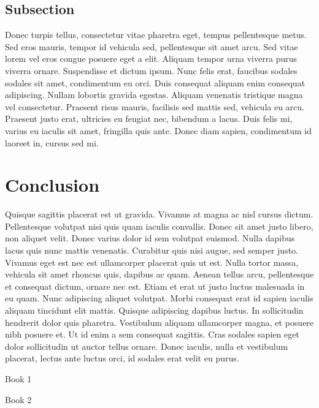 \documentclass[11pt,a4paper]{article}
\begin{document}
\subsection{Subsection}

Donec turpis tellus, consectetur vitae pharetra eget, tempus pellentesque metus. Sed eros mauris, tempor id vehicula sed, pellentesque sit amet arcu. Sed vitae lorem vel eros congue posuere eget a elit. Aliquam tempor urna viverra purus viverra ornare. Suspendisse et dictum ipsum. Nunc felis erat, faucibus sodales sodales sit amet, condimentum eu orci. Duis consequat aliquam enim consequat adipiscing. Nullam lobortis gravida egestas. Aliquam venenatis tristique magna vel consectetur. Praesent risus mauris, facilisis sed mattis sed, vehicula eu arcu. Praesent justo erat, ultricies eu feugiat nec, bibendum a lacus. Duis felis mi, varius eu iaculis sit amet, fringilla quis ante. Donec diam sapien, condimentum id laoreet in, cursus sed mi.

\section{Conclusion}

Quisque sagittis placerat est ut gravida. Vivamus at magna ac nisl cursus dictum. Pellentesque volutpat nisi quis quam iaculis convallis. Donec sit amet justo libero, non aliquet velit. Donec varius dolor id sem volutpat euismod. Nulla dapibus lacus quis nunc mattis venenatis. Curabitur quis nisi augue, sed semper justo. Vivamus eget est nec est ullamcorper placerat quis ut est. Nulla tortor massa, vehicula sit amet rhoncus quis, dapibus ac quam. Aenean tellus arcu, pellentesque et consequat dictum, ornare nec est. Etiam et erat ut justo luctus malesuada in eu quam. Nunc adipiscing aliquet volutpat. Morbi consequat erat id sapien iaculis aliquam tincidunt elit mattis. Quisque adipiscing dapibus luctus. In sollicitudin hendrerit dolor quis pharetra. Vestibulum aliquam ullamcorper magna, et posuere nibh posuere et. Ut id enim a sem consequat sagittis. Cras sodales sapien eget dolor sollicitudin ut auctor tellus ornare. Donec iaculis, nulla et vestibulum placerat, lectus ante luctus orci, id sodales erat velit eu purus.


\begin{thebibliography}{2}
  Book 1

  Book 2

\end{thebibliography}
\end{document}
